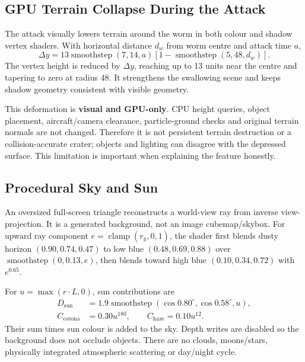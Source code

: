 \subsection{GPU Terrain Collapse During the Attack}
The attack visually lowers terrain around the worm in both colour and shadow vertex shaders. With horizontal distance $d_w$ from worm centre and attack time $a$,
\begin{equation}
\Delta y=13\operatorname{smoothstep}(7,14,a)[1-\operatorname{smoothstep}(5,48,d_w)].
\end{equation}
The vertex height is reduced by $\Delta y$, reaching up to 13 units near the centre and tapering to zero at radius 48. It strengthens the swallowing scene and keeps shadow geometry consistent with visible geometry.

This deformation is \textbf{visual and GPU-only}. CPU height queries, object placement, aircraft/camera clearance, particle-ground checks and original terrain normals are not changed. Therefore it is not persistent terrain destruction or a collision-accurate crater; objects and lighting can disagree with the depressed surface. This limitation is important when explaining the feature honestly.

\subsection{Procedural Sky and Sun}
An oversized full-screen triangle reconstructs a world-view ray from inverse view-projection. It is a generated background, not an image cubemap/skybox. For upward ray component $e=\operatorname{clamp}(r_y,0,1)$, the shader first blends dusty horizon $(0.90,0.74,0.47)$ to low blue $(0.48,0.69,0.88)$ over $\operatorname{smoothstep}(0,0.13,e)$, then blends toward high blue $(0.10,0.34,0.72)$ with $e^{0.65}$.

For $u=\max(r\cdot L,0)$, sun contributions are
\begin{align}
D_{\mathrm{sun}}&=1.9\operatorname{smoothstep}(\cos0.80^\circ,\cos0.58^\circ,u),\\
C_{\mathrm{corona}}&=0.30u^{180},\qquad C_{\mathrm{haze}}=0.10u^{12}.
\end{align}
Their sum times sun colour is added to the sky. Depth writes are disabled so the background does not occlude objects. There are no clouds, moons/stars, physically integrated atmospheric scattering or day/night cycle.


